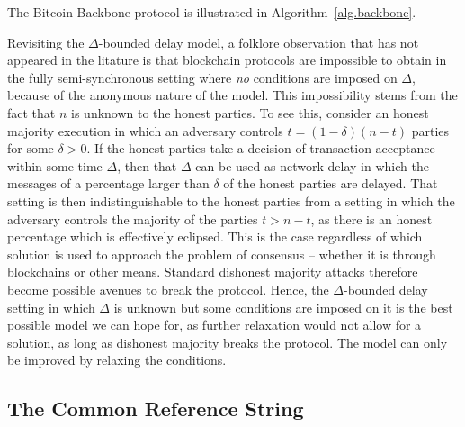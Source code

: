 \cite{backbone,pass-asynchronous,varbackbone}

The Bitcoin Backbone protocol is illustrated in Algorithm~\ref{alg.backbone}.



\begin{remark}
Revisiting the $\Delta$-bounded delay model, a folklore observation that has not appeared in
the litature is that blockchain protocols are impossible to obtain in the fully
semi-synchronous setting where \emph{no} conditions are imposed on $\Delta$,
because of the anonymous nature of the model. This impossibility stems from the
fact that $n$ is unknown to the honest parties. To see this, consider an
honest majority execution in which an adversary controls $t = (1 - \delta)(n -
t)$ parties for some $\delta > 0$. If the honest parties take a decision of
transaction acceptance within some time $\Delta$, then that $\Delta$ can be used
as network delay in which the messages of a percentage larger than $\delta$ of
the honest parties are delayed. That setting is then indistinguishable to the
honest parties from a setting in which the adversary controls the majority of
the parties $t > n - t$, as there is an honest percentage which is effectively
eclipsed. This is the case regardless of which solution is used to approach the
problem of consensus -- whether it is through blockchains or other means.
Standard dishonest majority attacks therefore become possible avenues to break
the protocol. Hence, the $\Delta$-bounded delay setting in which $\Delta$ is
unknown but some conditions are imposed on it is the best possible model we can
hope for, as further relaxation would not allow for a solution, as long as
dishonest majority breaks the protocol. The model can only be improved by
relaxing the conditions.
\end{remark}


\subsection{The Common Reference String}


